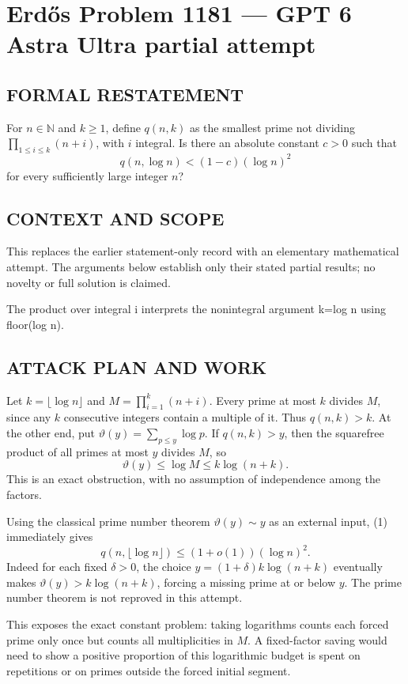 \section*{Erd\H{o}s Problem 1181 --- GPT 6 Astra Ultra partial attempt}


\subsection*{FORMAL RESTATEMENT}
For $n\in\mathbb N$ and $k\geq1$, define $q(n,k)$ as the smallest prime not dividing $\prod_{1\leq i\leq k}(n+i)$, with $i$ integral. Is there an absolute constant $c>0$ such that
\[q(n,\log n)<(1-c)(\log n)^2\]
for every sufficiently large integer $n$?

\subsection*{CONTEXT AND SCOPE}
This replaces the earlier statement-only record with an elementary mathematical attempt. The arguments below establish only their stated partial results; no novelty or full solution is claimed.

The product over integral i interprets the nonintegral argument k=log n using floor(log n).

\subsection*{ATTACK PLAN AND WORK}
Let $k=\lfloor\log n\rfloor$ and $M=\prod_{i=1}^k(n+i)$.
Every prime at most $k$ divides $M$, since any $k$ consecutive integers contain
a multiple of it. Thus $q(n,k)>k$.
At the other end, put $\vartheta(y)=\sum_{p\le y}\log p$.
If $q(n,k)>y$, then the squarefree product of all primes at most $y$ divides $M$,
so
\[\vartheta(y)\le\log M\le k\log(n+k).\tag{1}\]
This is an exact obstruction, with no assumption of independence among the factors.

Using the classical prime number theorem $\vartheta(y)\sim y$ as an external
input, (1) immediately gives
\[q(n,\lfloor\log n\rfloor)\le(1+o(1))(\log n)^2.\tag{2}\]
Indeed for each fixed $\delta>0$, the choice
$y=(1+\delta)k\log(n+k)$ eventually makes $\vartheta(y)>k\log(n+k)$,
forcing a missing prime at or below $y$. The prime number theorem is not
reproved in this attempt.

This exposes the exact constant problem: taking logarithms counts each forced
prime only once but counts all multiplicities in $M$. A fixed-factor saving
would need to show a positive proportion of this logarithmic budget is spent
on repetitions or on primes outside the forced initial segment.

